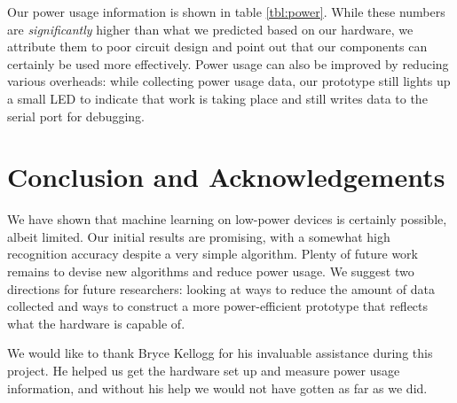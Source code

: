 \documentclass[12pt]{article}
\begin{document}
Our power usage information is shown in table \ref{tbl:power}. While these
numbers are \emph{significantly} higher than what we predicted based on our
hardware, we attribute them to poor circuit design and point out that our
components can certainly be used more effectively. Power usage can also be
improved by reducing various overheads: while collecting power usage data,
our prototype still lights up a small LED to indicate that work is taking place
and still writes data to the serial port for debugging.

\section{Conclusion and Acknowledgements}
We have shown that machine learning on low-power devices is certainly possible,
albeit limited. Our initial results are promising, with a somewhat high
recognition accuracy despite a very simple algorithm. Plenty of future work
remains to devise new algorithms and reduce power usage. We suggest two
directions for future researchers: looking at ways to reduce the amount of
data collected and ways to construct a more power-efficient prototype that
reflects what the hardware is capable of.

We would like to thank Bryce Kellogg for his invaluable assistance during this
project. He helped us get the hardware set up and measure power usage
information, and without his help we would not have gotten as far as we did.



\end{document}
